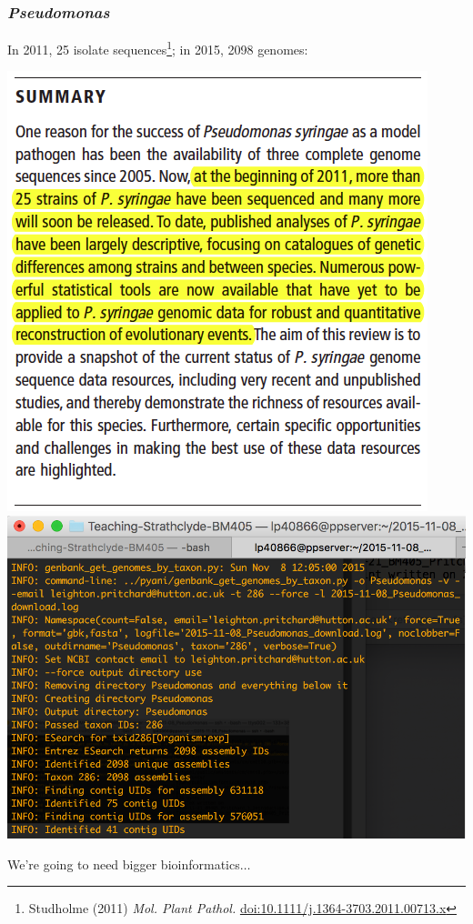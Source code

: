 \begin{frame}
  \frametitle{\textit{Pseudomonas}}
    In 2011, 25 isolate sequences\footnote{\tiny{Studholme (2011) \textit{Mol. Plant Pathol.} \href{http://dx.doi.org/10.1111/j.1364-3703.2011.00713.x}{doi:10.1111/j.1364-3703.2011.00713.x}}}; in 2015, 2098 genomes:
    \begin{center}
      \includegraphics[height=0.5\textheight]{images/pseud2011_abstract}
      \includegraphics[height=0.5\textheight]{images/pseud2015_genomecount}
    \end{center}     
    We're going to need bigger bioinformatics$\ldots$
\end{frame}

